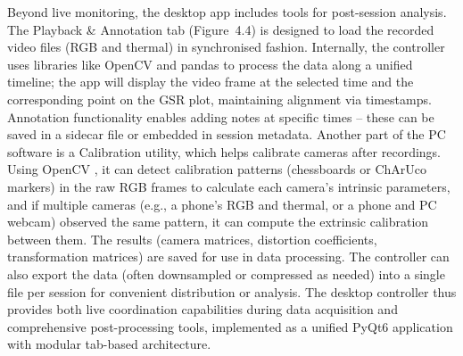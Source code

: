 Beyond live monitoring, the desktop app includes tools for post-session analysis. The Playback \& Annotation tab (Figure~4.4) is designed to load the recorded video files (RGB and thermal) in synchronised fashion. Internally, the controller uses libraries like OpenCV and pandas to process the data along a unified timeline; the app will display the video frame at the selected time and the corresponding point on the GSR plot, maintaining alignment via timestamps. Annotation functionality enables adding notes at specific times -- these can be saved in a sidecar file or embedded in session metadata. Another part of the PC software is a Calibration utility, which helps calibrate cameras after recordings. Using OpenCV \citep{ref22}, it can detect calibration patterns (chessboards or ChArUco markers) in the raw RGB frames to calculate each camera's intrinsic parameters, and if multiple cameras (e.g., a phone's RGB and thermal, or a phone and PC webcam) observed the same pattern, it can compute the extrinsic calibration between them. The results (camera matrices, distortion coefficients, transformation matrices) are saved for use in data processing. The controller can also export the data (often downsampled or compressed as needed) into a single file per session for convenient distribution or analysis. The desktop controller thus provides both live coordination capabilities during data acquisition and comprehensive post-processing tools, implemented as a unified PyQt6 application with modular tab-based architecture.

